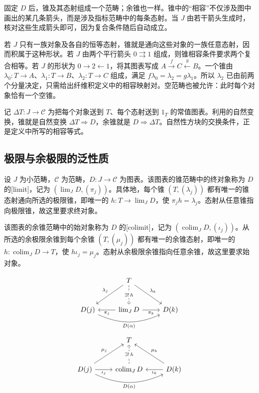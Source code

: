 固定 \(D\) 后，锥及其态射组成一个范畴；余锥也一样。锥中的“相容”不仅涉及图中画出的某几条箭头，而是涉及指标范畴中的每条态射。当 \(J\) 由若干箭头生成时，核对这些生成箭头即可，因为复合条件随后自动成立。

\begin{example}[几种指标范畴]\label{b4:exm:diagram-shapes}
	若 \(J\) 只有一族对象及各自的恒等态射，锥就是通向这些对象的一族任意态射，因而积属于这种形状。若 \(J\) 由两个平行箭头 \(0\rightrightarrows1\) 组成，则锥相容条件要求两个复合相等。若 \(J\) 的形状为 \(0\rightarrow2\leftarrow1\)，将其图表写成 \(A\xrightarrow{f}C\xleftarrow{g}B\)。一个锥由 \(\lambda_0:T\rightarrow A\)、\(\lambda_1:T\rightarrow B\)、\(\lambda_2:T\rightarrow C\) 组成，满足 \(f\lambda_0=\lambda_2=g\lambda_1\)。所以 \(\lambda_2\) 已由前两个分量决定，只需给出纤维积定义中的相容映射对。空范畴也被允许：此时每个对象恰有一个空锥。
\end{example}

记 \(\Delta T:J\rightarrow\mathcal C\) 为把每个对象送到 \(T\)、每个态射送到 \(1_T\) 的常值图表。利用的自然变换，锥就是自然变换 \(\Delta T\Rightarrow D\)，余锥就是 \(D\Rightarrow\Delta T\)。自然性方块的交换条件，正是定义中所写的相容等式。

\subsection{极限与余极限的泛性质}
\label{b4:subsec:0202:02}

\begin{definition}[极限与余极限]\label{b4:def:limit-colimit}
	设 \(J\) 为小范畴，\(\mathcal C\) 为范畴，\(D:J\rightarrow\mathcal C\) 为图表。该图表的锥范畴中的终对象称为 \(D\) 的[limit]，记为 \((\lim_JD,(\pi_j))\)。具体地，每个锥 \((T,(\lambda_j))\) 都有唯一的锥态射通向所选的极限锥，即唯一的 \(h:T\rightarrow\lim_JD\)，使 \(\pi_jh=\lambda_j\)。态射从任意锥指向极限锥，故这里要求终对象。

	\ProseParagraphBreak
	该图表的余锥范畴中的始对象称为 \(D\) 的[colimit]，记为 \((\operatorname{colim}_JD,(\iota_j))\)。从所选的余极限余锥到每个余锥 \((T,(\mu_j))\) 都有唯一的余锥态射，即唯一的 \(h:\operatorname{colim}_JD\rightarrow T\)，使 \(h\iota_j=\mu_j\)。态射从余极限余锥指向任意余锥，故这里要求始对象。
\end{definition}

\[
	\begin{tikzcd}[column sep=2.5em,row sep=large]
		&T\arrow[dl,"\lambda_j"']\arrow[dr,"\lambda_k"] \arrow[d,dashed,"\exists!\,h" description]&\\
		D(j)\arrow[rr,bend right=24,"D(\alpha)"']& \lim_JD\arrow[l,"\pi_j"]\arrow[r,"\pi_k"']&D(k)
	\end{tikzcd}
\]
\[
	\begin{tikzcd}[column sep=2.5em,row sep=large]
		&T&\\
		D(j)\arrow[r,"\iota_j"']\arrow[ur,"\mu_j"] \arrow[rr,bend right=24,"D(\alpha)"']& \operatorname{colim}_JD\arrow[u,dashed,"\exists!\,h" description]& D(k)\arrow[l,"\iota_k"]\arrow[ul,"\mu_k"']
	\end{tikzcd}
\]

